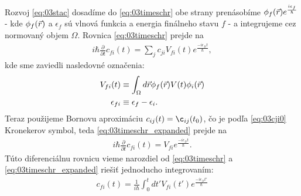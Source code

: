 Rozvoj \eqref{eq:03stac} dosadíme do \eqref{eq:03timeschr} obe strany prenásobíme $\phi_f(\vec{r})e^{\frac{i\epsilon_f}{\hbar}}$ - kde $\phi_f(\vec{r})$ a $\epsilon_f$ sú vlnová funkcia a energia finálneho stavu $f$ - a integrujeme cez normovaný objem $\Omega$. Rovnica \eqref{eq:03timeschr} prejde na 
\begin{align}
\label{eq:03timeschr_expanded}
i\hbar\frac{\partial}{\partial t}c_{fi}(t)=\sum_j c_{ji} V_{fi}(t)e^{\frac{-i \epsilon_{fi} t}{\hbar}} \mathrm{,}
\end{align}
kde sme zaviedli nasledovné označenia:
\begin{align}
V_{fi}(t) &\equiv \int_{\Omega}d\vec{r} \phi_f(\vec{r})V(t)\phi_i(\vec{r}) \\
\epsilon_{fi} &\equiv \epsilon_f - \epsilon_i \text{.}
\end{align}
Teraz použijeme Bornovu aproximáciu $c_{ij}(t)=\c_{ij}(t_0)$, čo je podľa \eqref{eq:03cji0} Kronekerov symbol, teda \eqref{eq:03timeschr_expanded} prejde na
\begin{align}
\label{eq:born_appr}
i\hbar\frac{\partial}{\partial t}c_{fi}(t)=V_{fi}e^{\frac{-i\epsilon_{fi} t}{\hbar}}\mathrm{.}
\end{align}
Túto diferenciálnu rovnicu vieme narozdiel od \eqref{eq:03timeschr} a \eqref{eq:03timeschr_expanded} riešiť jednoducho integrovaním:
\begin{align}
c_{fi}(t) = \frac{1}{i\hbar} \int_0^t dt' V_{fi}(t')e^{\frac{-i\epsilon_{fi} t'}{\hbar}}
\end{align}